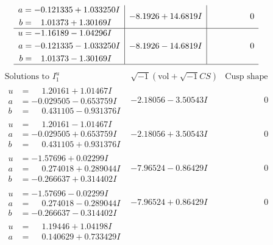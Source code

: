 \documentclass[1p]{elsarticle_modified}
\theoremstyle{definition}
\newcommand{\I}{\sqrt{-1}}
\begin{document}
$$\begin{array}{c|c|c}
\begin{aligned}
a &= -0.121335 + 1.033250 I \\
b &= \phantom{-}1.01373 + 1.30169 I\end{aligned}
 & -8.1926 + 14.6819 I & \phantom{-0.000000 } 0 \\ \hline\begin{aligned}
u &= -1.16189 - 1.04296 I \\
a &= -0.121335 - 1.033250 I \\
b &= \phantom{-}1.01373 - 1.30169 I\end{aligned}
 & -8.1926 - 14.6819 I & \phantom{-0.000000 } 0\\
 \hline 
 \end{array}$$\newpage$$\begin{array}{c|c|c}  
\text{Solutions to }I^u_{1}& \I (\text{vol} + \sqrt{-1}CS) & \text{Cusp shape}\\
 \hline 
\begin{aligned}
u &= \phantom{-}1.20161 + 1.01467 I \\
a &= -0.029505 - 0.653759 I \\
b &= \phantom{-}0.431105 - 0.931376 I\end{aligned}
 & -2.18056 - 3.50543 I & \phantom{-0.000000 } 0 \\ \hline\begin{aligned}
u &= \phantom{-}1.20161 - 1.01467 I \\
a &= -0.029505 + 0.653759 I \\
b &= \phantom{-}0.431105 + 0.931376 I\end{aligned}
 & -2.18056 + 3.50543 I & \phantom{-0.000000 } 0 \\ \hline\begin{aligned}
u &= -1.57696 + 0.02299 I \\
a &= \phantom{-}0.274018 + 0.289044 I \\
b &= -0.266637 + 0.314402 I\end{aligned}
 & -7.96524 - 0.86429 I & \phantom{-0.000000 } 0 \\ \hline\begin{aligned}
u &= -1.57696 - 0.02299 I \\
a &= \phantom{-}0.274018 - 0.289044 I \\
b &= -0.266637 - 0.314402 I\end{aligned}
 & -7.96524 + 0.86429 I & \phantom{-0.000000 } 0 \\ \hline\begin{aligned}
u &= \phantom{-}1.19446 + 1.04198 I \\
a &= \phantom{-}0.140629 + 0.733429 I \\

\end{aligned}
\end{array}$$
\end{document}
